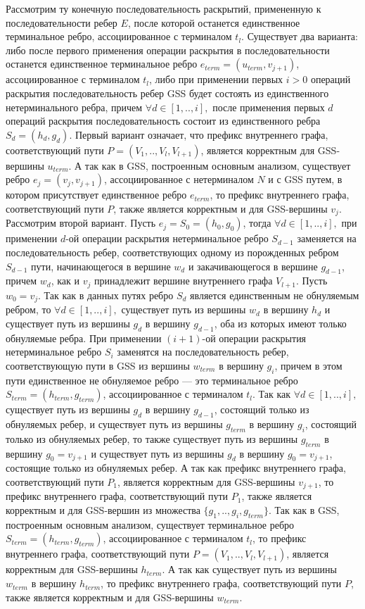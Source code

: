 Рассмотрим ту конечную последовательность раскрытий, примененную к последовательности ребер $E$, после которой останется единственное терминальное ребро, ассоциированное с терминалом $t_{l}$. Существует два варианта: либо после первого применения операции раскрытия в последовательности останется единственное терминальное ребро $e_{term} = (u_{term}, v_{j+1})$, ассоциированное с терминалом $t_{l}$, либо при применении первых $i > 0$ операций раскрытия последовательность ребер GSS будет состоять из единственного нетерминального ребра, причем $\forall d \in [1,..,i],$ после применения первых $d$ операций раскрытия последовательность состоит из единственного ребра $S_{d} = (h_{d}, g_{d})$. Первый вариант означает, что префикс внутреннего графа, соответствующий пути $P = (V_{1},..,V_{l},V_{l+1})$, является корректным для GSS-вершины $u_{term}$. А так как в GSS, построенным основным анализом, существует ребро $e_{j} = (v_{j}, v_{j+1})$, ассоциированное с нетерминалом $N$ и с GSS путем, в котором присутствует единственное ребро $e_{term}$, то префикс внутреннего графа, соответствующий пути $P$, также является корректным и для GSS-вершины $v_{j}$. Рассмотрим второй вариант. Пусть $e_{j} = S_{0} = (h_{0}, g_{0})$, тогда $\forall d \in [1,..,i],$ при применении $d$-ой операции раскрытия нетерминальное ребро $S_{d-1}$ заменяется на последовательность ребер, соответствующих одному из порожденных ребром $S_{d-1}$ пути, начинающегося в вершине $w_{d}$ и закачивающегося в вершине $g_{d-1}$, причем $w_{d}$, как и $v_{j}$ принадлежит вершине внутреннего графа $V_{l+1}$. Пусть $w_{0} = v_{j}$. Так как в данных путях ребро $S_{d}$ является единственным не обнуляемым ребром, то $\forall d \in [1,..,i],$ существует путь из вершины $w_{d}$ в вершину $h_{d}$ и существует путь из вершины $g_{d}$ в вершину $g_{d-1}$, оба из которых имеют только обнуляемые ребра. При применении $(i+1)$-ой операции раскрытия нетерминальное ребро $S_{i}$ заменятся на последовательность ребер, соответствующую пути в GSS из вершины $w_{term}$ в вершину $g_{i}$, причем в этом пути единственное не обнуляемое ребро --- это терминальное ребро $S_{term} = (h_{term}, g_{term})$, ассоциированное с терминалом $t_{l}$. Так как $\forall d \in [1,..,i],$ существует путь из вершины $g_{d}$ в вершину $g_{d-1}$, состоящий только из обнуляемых ребер, и существует путь из вершины $g_{term}$ в вершину $g_{i}$, состоящий только из обнуляемых ребер, то также существует путь из вершины $g_{term}$ в вершину $g_{0} = v_{j+1}$ и существует путь из вершины $g_{d}$ в вершину $g_{0} = v_{j+1}$, состоящие только из обнуляемых ребер. А так как префикс внутреннего графа, соответствующий пути $P_{1}$, является корректным для GSS-вершины $v_{j+1}$, то префикс внутреннего графа, соответствующий пути $P_{1}$, также является корректным и для GSS-вершин из множества $\{g_{1},..,g_{i}, g_{term}\}$. Так как в GSS, построенным основным анализом, существует терминальное ребро $S_{term} = (h_{term}, g_{term})$, ассоциированное с терминалом $t_{l}$, то префикс внутреннего графа, соответствующий пути $P = (V_{1},..,V_{l},V_{l+1})$, является корректным для GSS-вершины $h_{term}$.  А так как существует путь из вершины $w_{term}$ в вершину $h_{term}$, то префикс внутреннего графа, соответствующий пути $P$, также является корректным и для GSS-вершины $w_{term}$. 